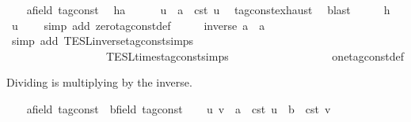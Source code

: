 \begin{isabellebody}
\begin{isamarkuptext}
\end{isamarkuptext}\isamarkuptrue%
\ \ \isamarkupfalse%
\ a{\isacharcolon}{\isacharcolon}{\isacartoucheopen}{\isacharprime}{\isasymtau}{\isacharcolon}{\isacharcolon}field\ tag{\isacharunderscore}const{\isacartoucheclose}\ \isamarkupfalse%
\ h{\isacharcolon}{\isacartoucheopen}a\ {\isasymnoteq}\ {}{\isacartoucheclose}\isanewline
\ \ \isamarkupfalse%
\ u\ \ {\isacartoucheopen}a\ {\isacharequal}\ {\isasymtau}\isactrlsub c\isactrlsub s\isactrlsub t\ u{\isacartoucheclose}\ \isamarkupfalse%
\ tag{\isacharunderscore}const{\isachardot}exhaust\ \isamarkupfalse%
\ blast\isanewline
\ \ \isamarkupfalse%
\ \isamarkupfalse%
\ h\ \isamarkupfalse%
\ {\isacartoucheopen}u\ {\isasymnoteq}\ {}{\isacartoucheclose}\ \isamarkupfalse%
\ {\isacharparenleft}simp\ add{\isacharcolon}\ zero{\isacharunderscore}tag{\isacharunderscore}const{\isacharunderscore}def{\isacharparenright}\isanewline
\ \ \isamarkupfalse%
\ \isamarkupfalse%
\ {\isacartoucheopen}inverse\ a\ {\isacharasterisk}\ a\ {\isacharequal}\ {}{\isacartoucheclose}\isanewline
\ \ \ \ \isamarkupfalse%
\ {\isacharparenleft}simp\ add{\isacharcolon}\ TESL{\isachardot}inverse{\isacharunderscore}tag{\isacharunderscore}const{\isachardot}simps\isanewline
\ \ \ \ \ \ \ \ \ \ \ \ \ \ \ \ \ \ TESL{\isachardot}times{\isacharunderscore}tag{\isacharunderscore}const{\isachardot}simps\isanewline
\ \ \ \ \ \ \ \ \ \ \ \ \ \ \ \ \ \ one{\isacharunderscore}tag{\isacharunderscore}const{\isacharunderscore}def{\isacharparenright}\isanewline
{}\isamarkupfalse%
%
\begin{isamarkuptext}%
Dividing is multiplying by the inverse.%
\end{isamarkuptext}\isamarkuptrue%
\ \ \isamarkupfalse%
\ a{\isacharcolon}{\isacharcolon}{\isacartoucheopen}{\isacharprime}{\isasymtau}{\isacharcolon}{\isacharcolon}field\ tag{\isacharunderscore}const{\isacartoucheclose}\ \ b{\isacharcolon}{\isacharcolon}{\isacartoucheopen}{\isacharprime}{\isasymtau}{\isacharcolon}{\isacharcolon}field\ tag{\isacharunderscore}const{\isacartoucheclose}\isanewline
\ \ \isamarkupfalse%
\ u\ v\ \ {\isacartoucheopen}a\ {\isacharequal}\ {\isasymtau}\isactrlsub c\isactrlsub s\isactrlsub t\ u{\isacartoucheclose}\ \ {\isacartoucheopen}b\ {\isacharequal}\ {\isasymtau}\isactrlsub c\isactrlsub s\isactrlsub t\ v{\isacartoucheclose}\ \isamarkupfalse%

\end{isabellebody}
